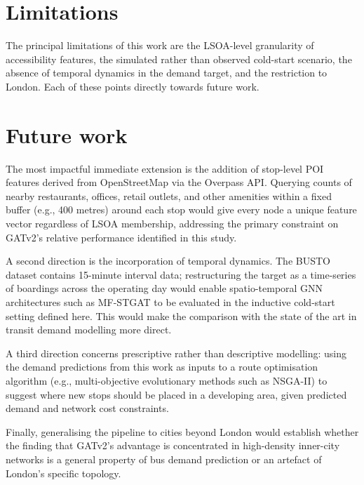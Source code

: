 \documentclass[12pt,a4paper]{report}
\begin{document}
\section{Limitations}
The principal limitations of this work are the LSOA-level granularity of
accessibility features, the simulated rather than observed cold-start
scenario, the absence of temporal dynamics in the demand target, and the
restriction to London. Each of these points directly towards future work.

\section{Future work}
The most impactful immediate extension is the addition of stop-level POI
features derived from OpenStreetMap via the Overpass API. Querying counts of
nearby restaurants, offices, retail outlets, and other amenities within a
fixed buffer (e.g., 400 metres) around each stop would give every node a
unique feature vector regardless of LSOA membership, addressing the primary
constraint on GATv2's relative performance identified in this study.

A second direction is the incorporation of temporal dynamics. The BUSTO dataset
contains 15-minute interval data; restructuring the target as a time-series
of boardings across the operating day would enable spatio-temporal GNN
architectures such as MF-STGAT \citep{zheng2025mfstgat} to be evaluated in
the inductive cold-start setting defined here. This would make the comparison
with the state of the art in transit demand modelling more direct.

A third direction concerns prescriptive rather than descriptive modelling:
using the demand predictions from this work as inputs to a route optimisation
algorithm (e.g., multi-objective evolutionary methods such as NSGA-II) to
suggest where new stops should be placed in a developing area, given predicted
demand and network cost constraints.

Finally, generalising the pipeline to cities beyond London would establish
whether the finding that GATv2's advantage is concentrated in high-density
inner-city networks is a general property of bus demand prediction or an
artefact of London's specific topology.




\end{document}
